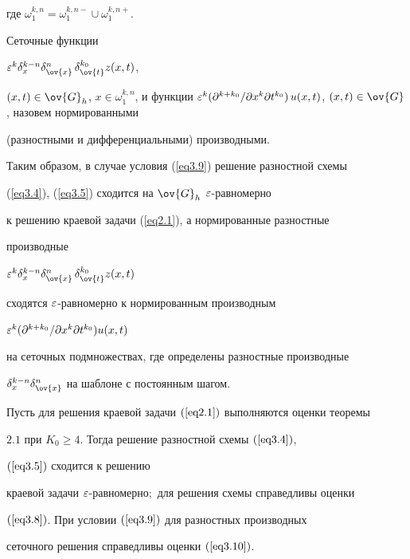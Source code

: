 где $\omega_1^{k,n}=\omega_1^{k,n-}\cup\omega_1^{k,n+}$.





Сеточные функции


$\eps^k\delta_x^{k-n}\delta^n_{\ov{x}}\,\delta^{k_0}_{\ov{t}}z(x,t)$,


$(x,t)\in\ov{G}_h$, $x\in\omega_1^{k,n}$, и функции $\eps^k(\pa^{k+k_0}/


\pa x^k\pa t^{k_0})\,u(x,t)$, $(x,t)\in\ov{G}$, назовем нормированными


(разностными и дифференциальными) производными.





Таким образом, в случае условия (\ref{eq3.9}) решение разностной схемы


(\ref{eq3.4}), (\ref{eq3.5}) сходится на $\ov{G}_{h}$\; $\varepsilon$-равномерно


к решению краевой задачи (\ref{eq2.1}), а нормированные разностные


производные


$\eps^k\delta^{k-n}_x\delta^n_{\ov{x}}\,\delta^{k_0}_{\ov{t}} z(x,t)$


сходятся $\varepsilon$-равномерно к нормированным производным


$\varepsilon^k(\partial^{k+k_0}/ \partial x^{k}\partial t^{k_0}) u(x,t)$


на сеточных подмножествах, где определены разностные производные


$\delta^{k-n}_x\delta_{\ov{x}}^n$ на шаблоне с постоянным шагом.





\begin{thms}


Пусть для решения краевой задачи $(\ref{eq2.1})$ выполняются оценки теоремы


$2.1$ при $K_0\ge 4$. Тогда решение разностной схемы $(\ref{eq3.4})$,


$(\ref{eq3.5})$ сходится к решению


краевой задачи $\varepsilon$-равномерно$;$ для решения схемы справедливы оценки


$(\ref{eq3.8})$. При условии $(\ref{eq3.9})$ для разностных производных


сеточного решения справедливы оценки $(\ref{eq3.10})$.


\end{thms}





